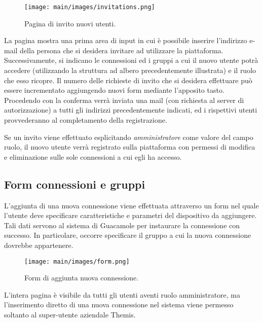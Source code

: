 \begin{figure}
\begin{center}
\texttt{[image: main/images/invitations.png]}
\end{center}
\caption{Pagina di invito nuovi utenti.}
\label{fig:invitations}
\end{figure}

La pagina mostra una prima area di input in cui è possibile inserire l'indirizzo e-mail della persona che si desidera invitare ad utilizzare la piattaforma. Successivamente, si indicano le connessioni ed i gruppi a cui il nuovo utente potrà accedere (utilizzando la struttura ad albero precedentemente illustrata) e il ruolo che esso ricopre.
Il numero delle richieste di invito che si desidera effettuare può essere incrementato aggiungendo nuovi form mediante l'apposito tasto.
Procedendo con la conferma verrà inviata una mail (con richiesta al server di autorizzazione) a tutti gli indirizzi precedentemente indicati, ed i rispettivi utenti provvederanno al completamento della registrazione.

Se un invito viene effettuato esplicitando \textit{amministratore} come valore del campo ruolo, il nuovo utente verrà registrato sulla piattaforma con permessi di modifica e eliminazione sulle sole connessioni a cui egli ha accesso.

\subsection{Form connessioni e gruppi}
\label{sec:form connessioni e gruppi}
L'aggiunta di una nuova connessione viene effettuata attraverso un form nel quale l'utente deve specificare caratteristiche e parametri del dispositivo da aggiungere. Tali dati servono al sistema di Guacamole per instaurare la connessione con successo. In particolare, occorre specificare il gruppo a cui la nuova connessione dovrebbe appartenere. 

\begin{figure}
\begin{center}
\texttt{[image: main/images/form.png]}
\end{center}
\caption{Form di aggiunta nuova connessione.}
\label{fig:connectionForm}
\end{figure}

L'intera pagina è visibile da tutti gli utenti aventi ruolo amministratore, ma l'inserimento diretto di una nuova connessione nel sistema viene permesso soltanto al super-utente aziendale Themis. 


